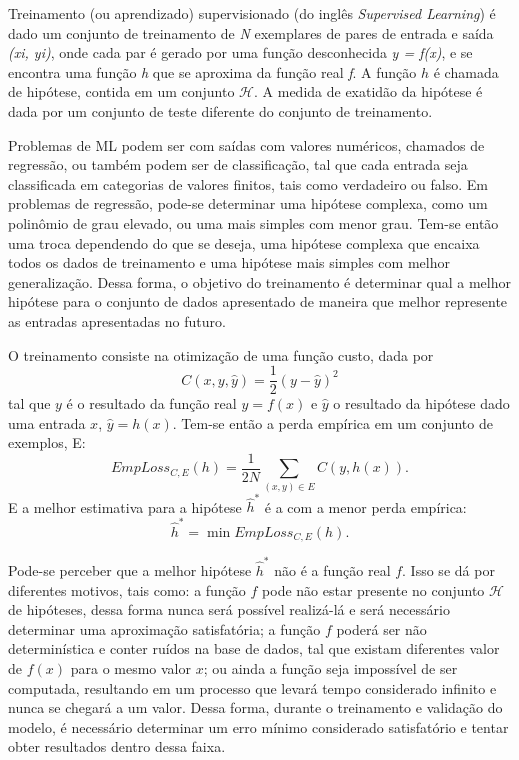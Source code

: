 \documentclass[
	12pt,				%
	oneside,			%
	a4paper,			%
	english,			%
	brazil				%
	]{abntex2}
\begin{document}
		
		Treinamento (ou aprendizado) supervisionado (do inglês \textit{Supervised Learning}) é dado um conjunto de treinamento de \textit{N} exemplares de pares de entrada e saída \textit{(x{\tiny i}, y{\tiny i})}, onde cada par é gerado por uma função desconhecida \textit{y = f(x)}, e se encontra uma função \textit{h} que se aproxima da função real \textit{f}. A função $h$ é chamada de hipótese, contida em um conjunto $\mathcal{H}$. A medida de exatidão da hipótese é dada por um conjunto de teste diferente do conjunto de treinamento.
	
	
	Problemas de ML podem ser com saídas com valores numéricos, chamados de regressão, ou também podem ser de classificação, tal que cada entrada seja classificada em categorias de valores finitos, tais como verdadeiro ou falso. Em problemas de regressão, pode-se determinar uma hipótese complexa, como um polinômio de grau elevado, ou uma mais simples com menor grau. Tem-se então uma troca dependendo do que se deseja, uma hipótese complexa que encaixa todos os dados de treinamento e uma hipótese mais simples com melhor generalização.
	Dessa forma, o objetivo do treinamento é determinar qual a melhor hipótese para o conjunto de dados apresentado de maneira que melhor represente as entradas apresentadas no futuro.
	

	O treinamento consiste na otimização de uma função custo, dada por $$ C(x, y , \hat{y}) = \frac{1}{2}(y - \hat{y})^{2} $$ tal que $ y $ é o resultado da função real $y = f(x)$ e $\hat{y}$ o resultado da hipótese dado uma entrada $x$, $\hat{y} = h(x)$.
	Tem-se então a perda empírica em um conjunto de exemplos, E: $$ EmpLoss_{C, E}(h) = \frac{1}{2N} \sum_{(x,y) \in E} C(y,h(x)). $$ 
	E a melhor estimativa para a hipótese $\hat{h}^*$ é a com a menor perda empírica:	$$ \hat{h}^* = \min EmpLoss_{C, E}(h). $$
	
	Pode-se perceber que a melhor hipótese $\hat{h}^*$ não é a função real $f$. Isso se dá por diferentes motivos, tais como: a função $f$ pode não estar presente no conjunto $\mathcal{H}$ de hipóteses, dessa forma nunca será possível realizá-lá e será necessário determinar uma aproximação satisfatória; a função $f$ poderá ser não determinística e conter ruídos na base de dados, tal que existam diferentes valor de $f(x)$ para o mesmo valor $x$; ou ainda a função seja impossível de ser computada, resultando em um processo que levará tempo considerado infinito e nunca se chegará a um valor. 
	Dessa forma, durante o treinamento e validação do modelo, é necessário determinar um erro mínimo considerado satisfatório e tentar obter resultados dentro dessa faixa. 
	
\end{document}
